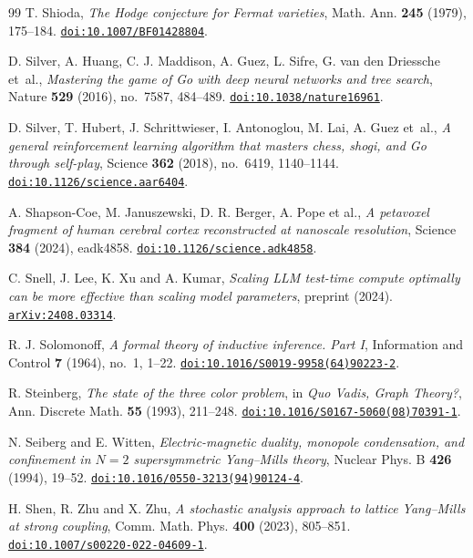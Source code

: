 \begin{thebibliography}{99}
T. Shioda,
\emph{The Hodge conjecture for Fermat varieties},
Math. Ann. \textbf{245} (1979), 175--184.
\href{https://doi.org/10.1007/BF01428804}{\nolinkurl{doi:10.1007/BF01428804}}.

D. Silver, A. Huang, C. J. Maddison, A. Guez, L. Sifre, G. van den Driessche et~al.,
\emph{Mastering the game of Go with deep neural networks and tree search},
Nature \textbf{529} (2016), no.~7587, 484--489.
\href{https://doi.org/10.1038/nature16961}{\nolinkurl{doi:10.1038/nature16961}}.

D. Silver, T. Hubert, J. Schrittwieser, I. Antonoglou, M. Lai, A. Guez et~al.,
\emph{A general reinforcement learning algorithm that masters chess, shogi, and Go through self-play},
Science \textbf{362} (2018), no.~6419, 1140--1144.
\href{https://doi.org/10.1126/science.aar6404}{\nolinkurl{doi:10.1126/science.aar6404}}.

A. Shapson-Coe, M. Januszewski, D. R. Berger, A. Pope et al.,
\emph{A petavoxel fragment of human cerebral cortex reconstructed at nanoscale resolution},
Science \textbf{384} (2024), eadk4858.
\href{https://doi.org/10.1126/science.adk4858}{\nolinkurl{doi:10.1126/science.adk4858}}.

C. Snell, J. Lee, K. Xu and A. Kumar,
\emph{Scaling LLM test-time compute optimally can be more effective than scaling model parameters},
preprint (2024).
\href{https://arxiv.org/abs/2408.03314}{\nolinkurl{arXiv:2408.03314}}.

R. J. Solomonoff,
\emph{A formal theory of inductive inference. Part I},
Information and Control \textbf{7} (1964), no.~1, 1--22.
\href{https://doi.org/10.1016/S0019-9958(64)90223-2}{\nolinkurl{doi:10.1016/S0019-9958(64)90223-2}}.

R. Steinberg,
\emph{The state of the three color problem},
in \emph{Quo Vadis, Graph Theory?}, Ann. Discrete Math. \textbf{55} (1993), 211--248.
\href{https://doi.org/10.1016/S0167-5060(08)70391-1}{\nolinkurl{doi:10.1016/S0167-5060(08)70391-1}}.

N. Seiberg and E. Witten,
\emph{Electric-magnetic duality, monopole condensation, and confinement in $N=2$ supersymmetric Yang--Mills theory},
Nuclear Phys. B \textbf{426} (1994), 19--52.
\href{https://doi.org/10.1016/0550-3213(94)90124-4}{\nolinkurl{doi:10.1016/0550-3213(94)90124-4}}.

H. Shen, R. Zhu and X. Zhu,
\emph{A stochastic analysis approach to lattice Yang--Mills at strong coupling},
Comm. Math. Phys. \textbf{400} (2023), 805--851.
\href{https://doi.org/10.1007/s00220-022-04609-1}{\nolinkurl{doi:10.1007/s00220-022-04609-1}}.


\end{thebibliography}
